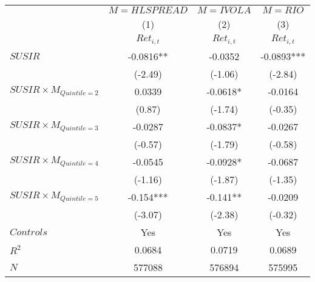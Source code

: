 \begin{tabular}{lccc}
\toprule
        & $M = HLSPREAD$ & $M = IVOLA$ & $M = RIO$ \\
        & (1)     & (2)     & (3) \\
        & $Ret_{i,t}$ & $Ret_{i,t}$ & $Ret_{i,t}$ \\
\midrule
$SUSIR$ & -0.0816** & -0.0352 & -0.0893*** \\
        & (-2.49) & (-1.06) & (-2.84) \\
$SUSIR \times M_{Quintile=2}$ & 0.0339  & -0.0618* & -0.0164 \\
        & (0.87)  & (-1.74) & (-0.35) \\
$SUSIR \times  M_{Quintile=3}$ & -0.0287 & -0.0837* & -0.0267 \\
        & (-0.57) & (-1.79) & (-0.58) \\
$SUSIR \times  M_{Quintile=4}$ & -0.0545 & -0.0928* & -0.0687 \\
        & (-1.16) & (-1.87) & (-1.35) \\
$SUSIR \times  M_{Quintile=5}$ & -0.154*** & -0.141** & -0.0209 \\
        & (-3.07) & (-2.38) & (-0.32) \\
\midrule
$Controls$ & Yes     & Yes     & Yes \\
$R^2$   & 0.0684  & 0.0719  & 0.0689 \\
$N$     & 577088  & 576894  & 575995 \\
\bottomrule
\end{tabular}%
